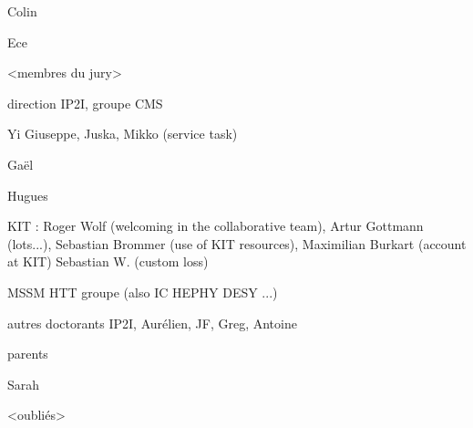 

Colin

Ece

<membres du jury>

direction IP2I, groupe CMS

Yi Giuseppe, Juska, Mikko (service task)

Gaël

Hugues

KIT : Roger Wolf (welcoming in the collaborative team), Artur Gottmann (lots...), Sebastian Brommer (use of KIT resources), Maximilian Burkart (account at KIT)
Sebastian W. (custom loss)

MSSM HTT groupe (also IC HEPHY DESY ...)

autres doctorants IP2I, Aurélien, JF, Greg, Antoine

parents

Sarah

<oubliés>
